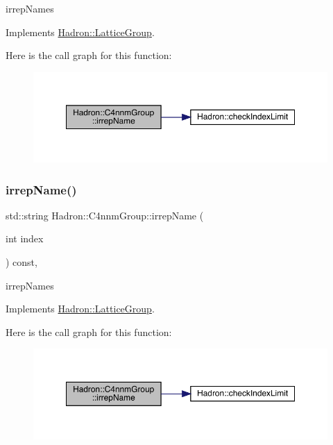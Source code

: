 irrep\+Names 

Implements \mbox{\hyperlink{structHadron_1_1LatticeGroup_a4bc5620218c2a73157e19bc4451fe746}{Hadron\+::\+Lattice\+Group}}.

Here is the call graph for this function\+:
\nopagebreak
\begin{figure}[H]
\begin{center}
\leavevmode
\includegraphics[width=350pt]{d1/dba/structHadron_1_1C4nnmGroup_ac2b3ee6989ddbd93bc63c46ac9626997_cgraph}
\end{center}
\end{figure}
\mbox{\label{structHadron_1_1C4nnmGroup_ac2b3ee6989ddbd93bc63c46ac9626997}} 
\subsubsection{\texorpdfstring{irrepName()}{irrepName()}\hspace{0.1cm}{\footnotesize\ttfamily [3/3]}}
{\footnotesize\ttfamily std\+::string Hadron\+::\+C4nnm\+Group\+::irrep\+Name (\begin{DoxyParamCaption}\item[{int}]{index }\end{DoxyParamCaption}) const\hspace{0.3cm}{\ttfamily [inline]}, {\ttfamily [virtual]}}

irrep\+Names 

Implements \mbox{\hyperlink{structHadron_1_1LatticeGroup_a4bc5620218c2a73157e19bc4451fe746}{Hadron\+::\+Lattice\+Group}}.

Here is the call graph for this function\+:
\nopagebreak
\begin{figure}[H]
\begin{center}
\leavevmode
\includegraphics[width=350pt]{d1/dba/structHadron_1_1C4nnmGroup_ac2b3ee6989ddbd93bc63c46ac9626997_cgraph}
\end{center}
\end{figure}
\mbox{\label{structHadron_1_1C4nnmGroup_a7553c7f91a8dc310b37b7b5da32e98f6}} 
